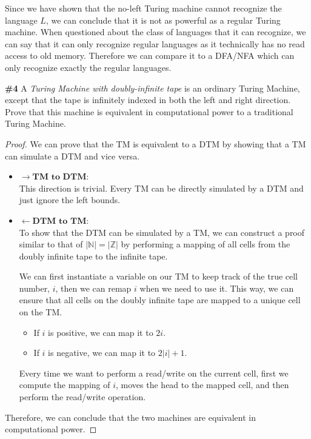 \documentclass{article}
\newcommand{\problem}[1]{\textbf{\##1}}
\newcommand{\prob}[1]{\problem{#1}}
\begin{document}
Since we have shown that the no-left Turing machine cannot recognize the language $L$, we can conclude that it is not as powerful as a regular Turing machine. When questioned about the class of languages that it can recognize, we can say that it can only recognize regular languages as it technically has no read access to old memory. Therefore we can compare it to a DFA/NFA which can only recognize exactly the regular languages.\\

\pagebreak

\prob{4} A \emph{Turing Machine with doubly-infinite tape} is an ordinary Turing Machine, except that the tape is infinitely indexed in both the left and right direction. Prove that this machine is equivalent in computational power to a traditional Turing Machine. 

\begin{proof}
    We can prove that the TM is equivalent to a DTM by showing that a TM can simulate a DTM and vice versa.\\
    \begin{itemize}
        \item[] $\rightarrow \textbf{TM to DTM}:$\\
        This direction is trivial. Every TM can be directly simulated by a DTM and just ignore the left bounds.
        \item[] $\leftarrow \textbf{DTM to TM}:$\\ 
        To show that the DTM can be simulated by a TM, we can construct a proof similar to that of $|\mathbb{N} | = |\mathbb{Z}|$ by performing a mapping of all cells from the doubly infinite tape to the infinite tape.

        We can first instantiate a variable on our TM to keep track of the true cell number, $i$, then we can remap $i$ when we need to use it. This way, we can ensure that all cells on the doubly infinite tape are mapped to a unique cell on the TM.\\
        \begin{itemize}
            \item If $i$ is positive, we can map it to $2i$.
            \item If $i$ is negative, we can map it to $2|i| + 1$.
        \end{itemize}
        Every time we want to perform a read/write on the current cell, first we compute the mapping of $i$, moves the head to the mapped cell, and then perform the read/write operation.\\
    \end{itemize}

    Therefore, we can conclude that the two machines are equivalent in computational power.
\end{proof}
\end{document}

